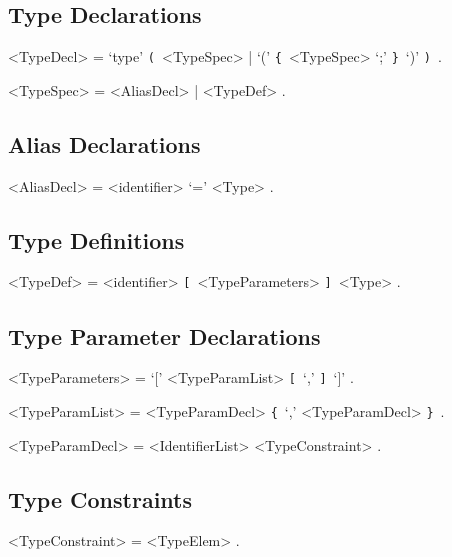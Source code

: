 \documentclass{article}
\def\lrep{\synshortsoff\texttt{\{}\synshorts~}
\def\rrep{\synshortsoff\texttt{\}}\synshorts~}
\def\lopt{\synshortsoff\texttt{[}\synshorts~}
\def\ropt{\synshortsoff\texttt{]}\synshorts~}
\def\lgrp{\synshortsoff\texttt{(}\synshorts~}
\def\rgrp{\synshortsoff\texttt{)}\synshorts~}
\begin{document}
\subsection*{Type Declarations} 
\begin{grammar} 
	<TypeDecl> = `type' \lgrp <TypeSpec>  | `(' \lrep <TypeSpec> `;' \rrep `)' \rgrp .

	<TypeSpec> = <AliasDecl> | <TypeDef>  .
\end{grammar} 

\subsection*{Alias Declarations}
\begin{grammar} 
	<AliasDecl> = <identifier> `=' <Type> . 
\end{grammar}



\subsection*{Type Definitions}
\begin{grammar} 
	<TypeDef> = <identifier> \lopt <TypeParameters> \ropt  <Type> .
\end{grammar}

\subsection*{Type Parameter Declarations}
\begin{grammar} 
	<TypeParameters> = `[' <TypeParamList> \lopt 	`,' \ropt `]' . 

	<TypeParamList> = <TypeParamDecl> \lrep `,' <TypeParamDecl> \rrep .
	
	<TypeParamDecl> = <IdentifierList> <TypeConstraint> . 
\end{grammar} 

\subsection*{Type Constraints}
\begin{grammar} 
	<TypeConstraint> = <TypeElem> .
\end{grammar} 
\end{document}
